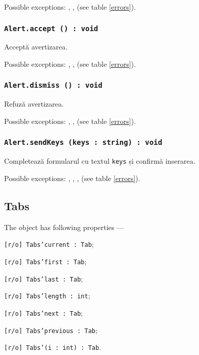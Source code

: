 Possible exceptions: , ,  (see table \ref{errors}).

\subsubsection{\texttt{Alert.accept () : void}}

Acceptă avertizarea.

Possible exceptions: , ,  (see table \ref{errors}).

\subsubsection{\texttt{Alert.dismiss () : void}}

Refuză avertizarea.

Possible exceptions: , ,  (see table \ref{errors}).

\subsubsection{\texttt{Alert.sendKeys (keys : string) : void}}

Completează formularul cu textul \texttt{keys} și confirmă inserarea.

Possible exceptions: , , ,  (see table \ref{errors}).

\subsection{{\color{orange} Tabs}}

The object \tabs{} has following properties —
\begin{icItems}
	\item \texttt{[r/o] Tabs'current : Tab};
	\item \texttt{[r/o] Tabs'first : Tab};
	\item \texttt{[r/o] Tabs'last : Tab};
	\item \texttt{[r/o] Tabs'length : int};
	\item \texttt{[r/o] Tabs'next : Tab};
	\item \texttt{[r/o] Tabs'previous : Tab};
	\item \texttt{[r/o] Tabs'(i : int) : Tab}.
\end{icItems}


